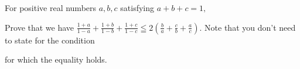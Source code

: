 For positive real numbers $a,b,c$ satisfying $a+b+c=1,$

Prove that we have $\frac{1+a}{1-a}+\frac{1+b}{1-b}+\frac{1+c}{1-c}\leqq 2\left(\frac{b}{a}+\frac{c}{b}+\frac{a}{c}\right).$ Note that you don't need to state for the condition

for which the equality holds.